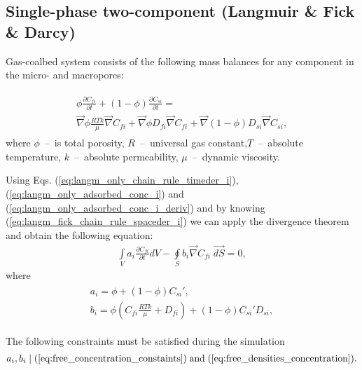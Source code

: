 \subsection*{Single-phase two-component (Langmuir \& Fick \& Darcy)}
Gas-coalbed system consists of the following mass balances for any component in the micro- and macropores:

\begin{eqnarray}
\begin{gathered}
\label{eq:langm_fick_diffusivity_differential}
\phi\frac{\partial C_{fi}}{\partial t} + \left(\mathit{1}-\phi\right)\frac{\partial C_{si}}{\partial t} = \\ \vec{\nabla} \phi\frac{RTk}{\mu} \vec{\nabla}C_{fi} + \vec{\nabla} \phi D_{fi} \vec{\nabla}C_{fi} + \vec{\nabla}\left(\mathit{1}-\phi \right) D_{si} \vec{\nabla}C_{si},
\end{gathered}
\end{eqnarray}
where $\phi$~--~is total porosity, $R$~--~universal gas constant,$T$~--~absolute temperature, $k$~--~absolute permeability, $\mu$~--~dynamic viscosity.

Using Eqs. (\ref{eq:langm_only_chain_rule_timeder_i}), (\ref{eq:langm_only_adsorbed_conc_i}) and (\ref{eq:langm_only_adsorbed_conc_i_deriv}) and by knowing (\ref{eq:langm_fick_chain_rule_spaceder_i}) we can apply the divergence theorem and obtain the following equation:
\begin{eqnarray}
\label{eq:langm_fick_diffusivity_simplified_integral}
\int \limits_{V} a_{i} \frac{\partial C_{fi}}{\partial t} d V - \oint \limits_{S} b_{i} \vec{\nabla}C_{fi} \; \vec{dS} =  \mathit{0},
\end{eqnarray}
where  
\begin{eqnarray}
\begin{gathered}
\label{eq:langm_fick_diffusivity_a_b_coeffs}
a_{i}  =  \phi + \left(\mathit{1}-\phi \right)C_{si}', \\ 
b_{i}  = \phi \left(C_{fi} \frac{RTk}{\mu} + D_{fi}\right) + \left(\mathit{1}-\phi \right) C_{si}'D_{si},
\end{gathered}
\end{eqnarray}

The following constraints must be satisfied during the simulation
\begin{eqnarray}
\label{eq:angm_fick_concentration_constaints}
a_{i}, b_{i} \mid  (\ref{eq:free_concentration_constaints}) \; \text{and} \; (\ref{eq:free_densities_concentration}).
\end{eqnarray}